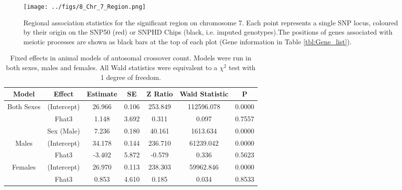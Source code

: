 \documentclass[a4paper,11pt]{article}
\begin{document}
\begin{figure}[H]
	\centering 
	\captionsetup{width=.9\textwidth}
	\texttt{[image: ../figs/8\_Chr\_7\_Region.png]}
	\caption{Regional association statistics for the significant region on chromosome 7. Each point represents a single SNP locus, coloured by their origin on the SNP50 (red) or SNPHD Chips (black, i.e. imputed genotypes).The positions of genes associated with meiotic processes are shown as black bars at the top of each plot (Gene information in Table \ref{tbl:Gene_list}).}
	
		\label{fig:chr7_region}
	\end{figure} 




\begin{table}[H]
	\captionsetup{width=.9\textwidth}
	\caption{Fixed effects in animal models of autosomal crossover count. Models were run in both sexes, males and females. All Wald statistics were equivalent to a $\chi^{2}$ test with 1 degree of freedom.}
	\centering
	\small
	\setlength{\extrarowheight}{.5em}
	\begin{tabular}{ccccccc}
		\hline
Model	&	Effect	&	Estimate	&	SE	&	Z Ratio	&	Wald Statistic	&	P	\\ \hline
Both Sexes	&	(Intercept)	&	26.966	&	0.106	&	253.849	&	112596.078	&	0.0000	\\
&	Fhat3	&	1.148	&	3.692	&	0.311	&	0.097	&	0.7557	\\
&	Sex (Male)	&	7.236	&	0.180	&	40.161	&	1613.634	&	0.0000	\\
Males	&	(Intercept)	&	34.178	&	0.144	&	236.710	&	61239.042	&	0.0000	\\
&	Fhat3	&	-3.402	&	5.872	&	-0.579	&	0.336	&	0.5623	\\
Females	&	(Intercept)	&	26.970	&	0.113	&	238.303	&	59962.846	&	0.0000	\\
&	Fhat3	&	0.853	&	4.610	&	0.185	&	0.034	&	0.8533	\\

		
		\hline
		
	\end{tabular}
	
	\label{tbl:Fixed_effects}
\end{table}
\end{document}

